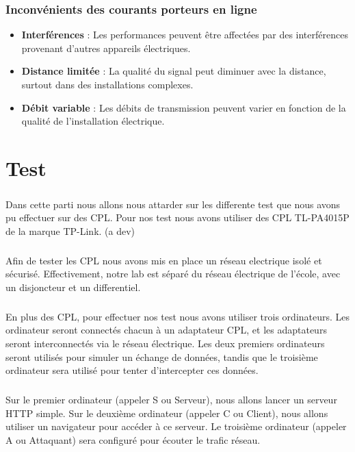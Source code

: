 \documentclass[a4paper,draft,twocolumn]{report}
\begin{document}
\subsection{Inconvénients des courants porteurs en ligne}
\begin{itemize}
    \item \textbf{Interférences} : Les performances peuvent être affectées par des interférences provenant d'autres appareils électriques.
    \item \textbf{Distance limitée} : La qualité du signal peut diminuer avec la distance, surtout dans des installations complexes.
    \item \textbf{Débit variable} : Les débits de transmission peuvent varier en fonction de la qualité de l'installation électrique.
\end{itemize}



\chapter{Test}
\paragraph{}Dans cette parti nous allons nous attarder sur les differente test que nous avons pu effectuer sur des CPL. Pour nos test nous avons utiliser des CPL TL-PA4015P de la marque TP-Link. (a dev)
\paragraph{}Afin de tester les CPL nous avons mis en place un réseau electrique isolé et sécurisé. Effectivement, notre lab est séparé du réseau électrique de l'école, avec un disjoncteur et un differentiel.
\paragraph{}En plus des CPL, pour effectuer nos test nous avons utiliser trois ordinateurs. Les ordinateur seront connectés chacun à un adaptateur CPL, et les adaptateurs seront interconnectés via le réseau électrique. Les deux premiers ordinateurs seront utilisés pour simuler un échange de données, tandis que le troisième ordinateur sera utilisé pour tenter d'intercepter ces données.
\paragraph{}Sur le premier ordinateur (appeler S ou Serveur), nous allons lancer un serveur HTTP simple. Sur le deuxième ordinateur (appeler C ou Client), nous allons utiliser un navigateur pour accéder à ce serveur. Le troisième ordinateur (appeler A ou Attaquant) sera configuré pour écouter le trafic réseau.
\end{document}
